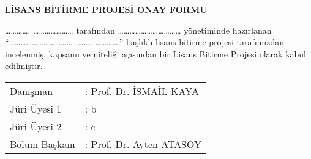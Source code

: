 \textbf{LİSANS BİTİRME PROJESİ ONAY FORMU}

\ldots\ldots\ldots\ldots. \ldots\ldots\ldots\ldots\ldots\ldots\ldots{}
tarafından
\ldots\ldots\ldots\ldots\ldots\ldots\ldots\ldots\ldots\ldots\ldots{}
yönetiminde hazırlanan
``\ldots\ldots\ldots\ldots\ldots\ldots\ldots\ldots\ldots\ldots\ldots\ldots\ldots\ldots\ldots\ldots\ldots\ldots\ldots.''
başlıklı lisans bitirme projesi tarafımızdan incelenmiş, kapsamı ve
niteliği açısından bir Lisans Bitirme Projesi olarak kabul edilmiştir.

\vspace{100pt}

\begin{table}[h]
\begin{flushleft}
\begin{tabular}{@{}ll}
Danışman        & : \space Prof. Dr. İSMAİL KAYA \vspace{24pt} \\
Jüri Üyesi 1    & : \space b \vspace{24pt} \\
Jüri Üyesi 2    & : \space c \vspace{100pt} \\
Bölüm Başkanı   & : \space Prof. Dr. Ayten ATASOY
\end{tabular}
\end{flushleft}
\end{table}



